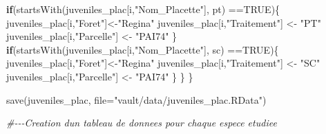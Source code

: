 \documentclass[
  12pt,
  american,
  a4paper,
  extrafontsizes,onecolumn,openright
  ]{memoir}
\newenvironment{Shaded}{\begin{snugshade}}{\end{snugshade}}
\newcommand{\AttributeTok}[1]{\textcolor[rgb]{0.77,0.63,0.00}{#1}}
\newcommand{\CommentTok}[1]{\textcolor[rgb]{0.56,0.35,0.01}{\textit{#1}}}
\newcommand{\ConstantTok}[1]{\textcolor[rgb]{0.00,0.00,0.00}{#1}}
\newcommand{\ControlFlowTok}[1]{\textcolor[rgb]{0.13,0.29,0.53}{\textbf{#1}}}
\newcommand{\FunctionTok}[1]{\textcolor[rgb]{0.00,0.00,0.00}{#1}}
\newcommand{\NormalTok}[1]{#1}
\newcommand{\OtherTok}[1]{\textcolor[rgb]{0.56,0.35,0.01}{#1}}
\newcommand{\SpecialCharTok}[1]{\textcolor[rgb]{0.00,0.00,0.00}{#1}}
\newcommand{\StringTok}[1]{\textcolor[rgb]{0.31,0.60,0.02}{#1}}
\begin{document}
\begin{Shaded}
\begin{Highlighting}[]
    \ControlFlowTok{if}\NormalTok{(}\FunctionTok{startsWith}\NormalTok{(juveniles\_plac[i,}\StringTok{"Nom\_Placette"}\NormalTok{], }\StringTok{\textquotesingle{}pt\textquotesingle{}}\NormalTok{) }\SpecialCharTok{==}\ConstantTok{TRUE}\NormalTok{)\{}
\NormalTok{    juveniles\_plac[i,}\StringTok{"Foret"}\NormalTok{]}\OtherTok{\textless{}{-}}\StringTok{"Regina"}
\NormalTok{    juveniles\_plac[i,}\StringTok{"Traitement"}\NormalTok{] }\OtherTok{\textless{}{-}} \StringTok{"PT"}
\NormalTok{    juveniles\_plac[i,}\StringTok{"Parcelle"}\NormalTok{] }\OtherTok{\textless{}{-}} \StringTok{"PAI74"}
\NormalTok{    \}}
    \ControlFlowTok{if}\NormalTok{(}\FunctionTok{startsWith}\NormalTok{(juveniles\_plac[i,}\StringTok{"Nom\_Placette"}\NormalTok{], }\StringTok{\textquotesingle{}sc\textquotesingle{}}\NormalTok{) }\SpecialCharTok{==}\ConstantTok{TRUE}\NormalTok{)\{}
\NormalTok{    juveniles\_plac[i,}\StringTok{"Foret"}\NormalTok{]}\OtherTok{\textless{}{-}}\StringTok{"Regina"}
\NormalTok{    juveniles\_plac[i,}\StringTok{"Traitement"}\NormalTok{] }\OtherTok{\textless{}{-}} \StringTok{"SC"}
\NormalTok{    juveniles\_plac[i,}\StringTok{"Parcelle"}\NormalTok{] }\OtherTok{\textless{}{-}} \StringTok{"PAI74"}
\NormalTok{      \}}
\NormalTok{  \}}
\NormalTok{\}}


\FunctionTok{save}\NormalTok{(juveniles\_plac, }\AttributeTok{file=}\StringTok{"vault/data/juveniles\_plac.RData"}\NormalTok{)}

\CommentTok{\#{-}{-}{-}Creation d\textquotesingle{}un tableau de donnees pour chaque espece etudiee}


\end{Highlighting}
\end{Shaded}
\end{document}
